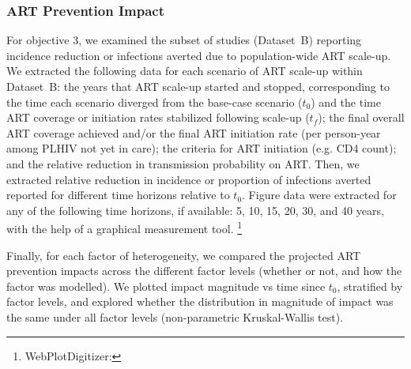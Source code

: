 \subsubsection{ART Prevention Impact}
\label{sss:meth:api}
For objective 3, we examined the subset of studies (Dataset~B)
reporting incidence reduction or infections averted due to
population-wide ART scale-up.
We extracted the following data for each scenario of ART scale-up within Dataset~B:
the years that ART scale-up started and stopped, corresponding to
the time each scenario diverged from the base-case scenario ($t_0$) and
the time ART coverage or initiation rates stabilized following scale-up ($t_f$);
the final overall ART coverage achieved and/or
the final ART initiation rate (per person-year among PLHIV not yet in care);
the criteria for ART initiation (e.g. CD4 count);
and the relative reduction in transmission probability on ART.
Then, we extracted relative reduction in incidence or proportion of infections averted
reported for different time horizons relative to $t_0$.
Figure data were extracted for any of the following time horizons, if available:
5, 10, 15, 20, 30, and 40 years,
with the help of a graphical measurement tool.%
\footnote{WebPlotDigitizer: }
\par
Finally, for each factor of heterogeneity,
we compared the projected ART prevention impacts across
the different factor levels (whether or not, and how the factor was modelled).
We plotted impact magnitude vs time since $t_0$, stratified by factor levels,
and explored whether the distribution in magnitude of impact
was the same under all factor levels (non-parametric Kruskal-Wallis test).